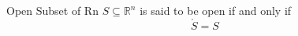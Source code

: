 \documentclass{standalone}
\begin{document}
\begin{defn*}{Open Subset of Rn}
  $S \subseteq \mathbb{R} ^{n}$ is said to be open if and only if 
  \[
  \mathring{S} = S
  \]
\end{defn*}
\end{document}
